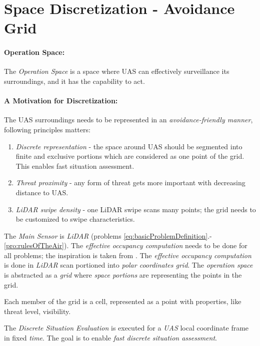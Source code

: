 \cleardoublepage
\section{Space Discretization - Avoidance Grid}\label{s:AvoidanceGrid}

\paragraph{Operation Space:} The \emph{Operation Space} is a space where UAS can effectively surveillance its surroundings, and it has the capability to act.

\paragraph{A Motivation for Discretization:} The UAS surroundings needs to be represented in an \emph{avoidance-friendly manner}, following principles matters:

\begin{enumerate}
	\item \emph{Discrete representation} - the space around UAS should be segmented into finite and exclusive portions which are considered as one point of the grid. This enables fast situation assessment. 
	
	\item \emph{Threat proximity} - any form of threat gets more important with decreasing distance to UAS.
	
	\item \emph{LiDAR swipe density} - one LiDAR swipe scans many points; the grid needs to be customized to swipe characteristics.
\end{enumerate}


The \emph{Main Sensor} is \emph{LiDAR} (problems \ref{eq:basicProblemDefinition}.-\ref{pro:rulesOfTheAir}).  The \emph{effective occupancy computation} needs to be done for all problems; the inspiration is taken from \cite{homm2010efficient}.  The \emph{effective occupancy computation} is done in \emph{LiDAR} scan  portioned into \emph{polar coordinates grid}. The \emph{operation space} is abstracted as a \emph{grid} where \emph{space portions} are representing the points in the grid.

\begin{note}
	Each member of the grid is a cell, represented as a point with properties, like threat level, visibility.
\end{note}

The \emph{Discrete Situation Evaluation} is executed for a \emph{UAS} local coordinate frame in fixed \emph{time}.  The goal is to enable \emph{fast discrete situation assessment}. 


